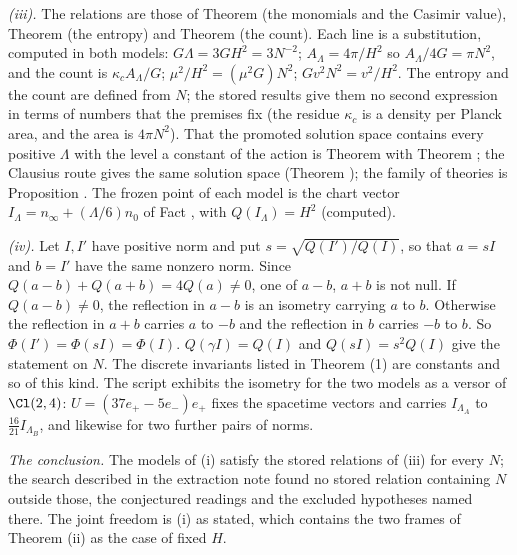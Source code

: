 \emph{(iii).} The relations are those of Theorem  (the monomials and the Casimir value), Theorem  (the entropy) and Theorem  (the count). Each line is a substitution, computed in both models: $G\Lambda = 3GH^{2} = 3N^{-2}$; $A_{\Lambda} = 4\pi/H^{2}$ so $A_{\Lambda}/4G = \pi N^{2}$, and the count is $\kappa_{c}A_{\Lambda}/G$; $\mu^{2}/H^{2} = (\mu^{2}G)N^{2}$; $Gv^{2}N^{2} = v^{2}/H^{2}$. The entropy and the count are defined from $N$; the stored results give them no second expression in terms of numbers that the premises fix (the residue $\kappa_{c}$ is a density per Planck area, and the area is $4\pi N^{2}$). That the promoted solution space contains every positive $\Lambda$ with the level a constant of the action is Theorem  with Theorem ; the Clausius route gives the same solution space (Theorem ); the family of theories is Proposition . The frozen point of each model is the chart vector $I_{\Lambda} = n_{\infty} + (\Lambda/6)n_{0}$ of Fact , with $Q(I_{\Lambda}) = H^{2}$ (computed).

\emph{(iv).} Let $I, I'$ have positive norm and put $s = \sqrt{Q(I')/Q(I)}$, so that $a = sI$ and $b = I'$ have the same nonzero norm. Since $Q(a - b) + Q(a + b) = 4Q(a) \neq 0$, one of $a - b$, $a + b$ is not null. If $Q(a - b) \neq 0$, the reflection in $a - b$ is an isometry carrying $a$ to $b$. Otherwise the reflection in $a + b$ carries $a$ to $-b$ and the reflection in $b$ carries $-b$ to $b$. So $\Phi(I') = \Phi(sI) = \Phi(I)$. $Q(\gamma I) = Q(I)$ and $Q(sI) = s^{2}Q(I)$ give the statement on $N$. The discrete invariants listed in Theorem (1) are constants and so of this kind. The script exhibits the isometry for the two models as a versor of $\Cl(2,4)$: $U = (37e_{+} - 5e_{-})e_{+}$ fixes the spacetime vectors and carries $I_{\Lambda_{A}}$ to $\tfrac{16}{21}I_{\Lambda_{B}}$, and likewise for two further pairs of norms.

\emph{The conclusion.} The models of (i) satisfy the stored relations of (iii) for every $N$; the search described in the extraction note found no stored relation containing $N$ outside those, the conjectured readings and the excluded hypotheses named there. The joint freedom is (i) as stated, which contains the two frames of Theorem (ii) as the case of fixed $H$.
